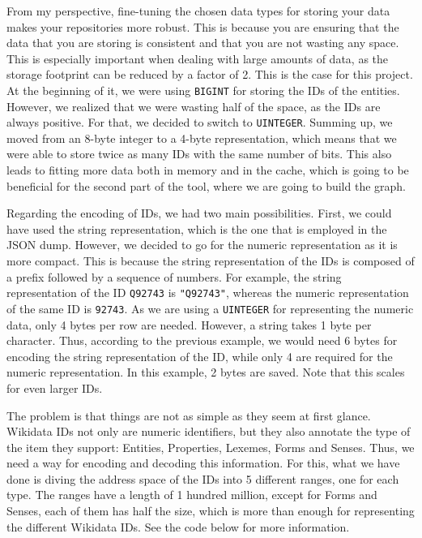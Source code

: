From my perspective, fine-tuning the chosen data types for storing your data makes your repositories more robust. This is because you are ensuring that the data that you are storing is consistent and that you are not wasting any space. This is especially important when dealing with large amounts of data, as the storage footprint can be reduced by a factor of 2. This is the case for this project. At the beginning of it, we were using \texttt{BIGINT} for storing the IDs of the entities. However, we realized that we were wasting half of the space, as the IDs are always positive. For that, we decided to switch to \texttt{UINTEGER}. Summing up, we moved from an 8-byte integer to a 4-byte representation, which means that we were able to store twice as many IDs with the same number of bits. This also leads to fitting more data both in memory and in the cache, which is going to be beneficial for the second part of the tool, where we are going to build the graph.

Regarding the encoding of IDs, we had two main possibilities. First, we could have used the string representation, which is the one that is employed in the JSON dump. However, we decided to go for the numeric representation as it is more compact. This is because the string representation of the IDs is composed of a prefix followed by a sequence of numbers. For example, the string representation of the ID \texttt{Q92743} is \texttt{"Q92743"}, whereas the numeric representation of the same ID is \texttt{92743}. As we are using a \texttt{UINTEGER} for representing the numeric data, only 4 bytes per row are needed. However, a string takes 1 byte per character. Thus, according to the previous example, we would need 6 bytes for encoding the string representation of the ID, while only 4 are required for the numeric representation. In this example, 2 bytes are saved. Note that this scales for even larger IDs.

The problem is that things are not as simple as they seem at first glance. Wikidata IDs not only are numeric identifiers, but they also annotate the type of the item they support: Entities, Properties, Lexemes, Forms and Senses. Thus, we need a way for encoding and decoding this information. For this, what we have done is diving the address space of the IDs into 5 different ranges, one for each type. The ranges have a length of 1 hundred million, except for Forms and Senses, each of them has half the size, which is more than enough for representing the different Wikidata IDs. See the code below for more information.

